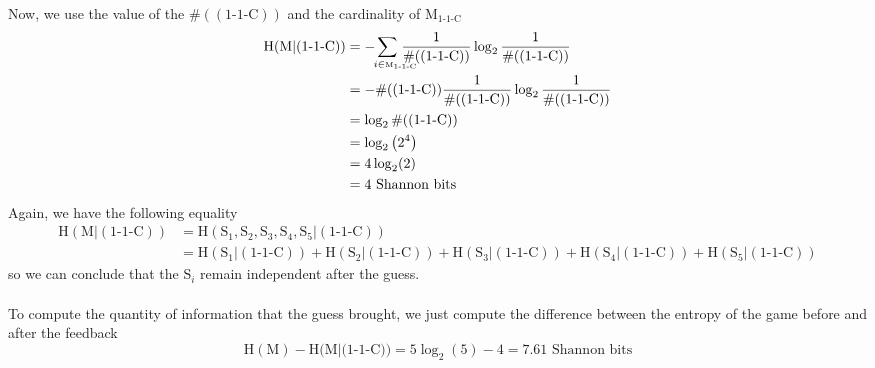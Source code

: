 \documentclass{article}
\begin{document}
Now, we use the value of the $\#((\mbox{1-1-C}))$ and the cardinality of $\mbox{M}_{\mbox{1-1-C}}$
\begin{align*}
    \mbox{H}(\mbox{M}|(\mbox{1-1-C})) &=-\hspace{-0.5cm}\sum_{\hspace{0.4cm}i\tiny\in\mbox{M}_{\mbox{1-1-C}}}\hspace{-0.45cm}\frac{1}{\#((\mbox{1-1-C}))}\log_2\frac{1}{\#((\mbox{1-1-C}))}\\
    &= -\#((\mbox{1-1-C})) \frac{1}{\#((\mbox{1-1-C}))}\log_2\frac{1}{\#((\mbox{1-1-C}))}\\
    &= \log_2\#((\mbox{1-1-C}))\\
    &=\log_2\left(2^4\right)\\
    &=4\log_2(2)\\
    &=4\mbox{ Shannon bits}
\end{align*}
Again, we have the following equality
\begin{align*}
\mbox{H}(\mbox{M}|(\mbox{1-1-C})) &= \mbox{H}(\mbox{S}_1, \mbox{S}_2, \mbox{S}_3, \mbox{S}_4, \mbox{S}_5|(\mbox{1-1-C}))\\
&= \mbox{H}(\mbox{S}_1|(\mbox{1-1-C})) + \mbox{H}(\mbox{S}_2|(\mbox{1-1-C})) + \mbox{H}(\mbox{S}_3|(\mbox{1-1-C})) + \mbox{H}(\mbox{S}_4|(\mbox{1-1-C})) + \mbox{H}(\mbox{S}_5|(\mbox{1-1-C}))
\end{align*}
so we can conclude that the $\mbox{S}_i$ remain independent after the guess.
\\\\
To compute the quantity of information that the guess brought, we just compute the difference between the entropy of the game before and after the feedback
$$
\mbox{H}(\mbox{M}) - \mbox{H}(\mbox{M}|(\mbox{1-1-C))} = 5\log_2(5) -4= 7.61\mbox{ Shannon bits}
$$
\end{document}
